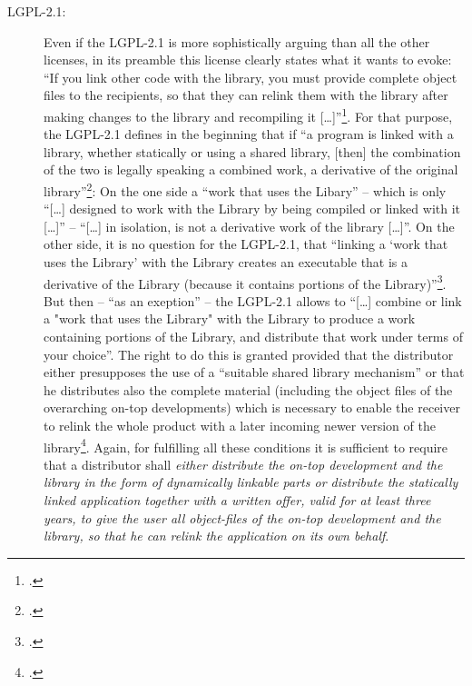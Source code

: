 \begin{description}
  \item[LGPL-2.1:] Even if the LGPL-2.1 is more sophistically arguing than all
  the other licenses, in its preamble this license clearly states what it wants
  to evoke: \enquote{If you link other code with the library, you must provide
  complete object files to the recipients, so that they can relink them with the
  library after making changes to the library and recompiling it
  [\ldots]}\footcite[cf.][\nopage wp\. preamble]{Lgpl21OsiLicense1999a}. For
  that purpose, the LGPL-2.1 defines in the beginning that if \enquote{a program
  is linked with a library, whether statically or using a shared library, [then]
  the combination of the two is legally speaking a combined work, a derivative
  of the original library}\footcite[cf.][\nopage wp.\
  preamble]{Lgpl21OsiLicense1999a}: On the one side a \enquote{work that uses
  the Libary} -- which is only \enquote{[\ldots] designed to work with the
  Library by being compiled or linked with it [\ldots]} -- \enquote{[\ldots] in
  isolation, is not a derivative work of the library [\ldots]}. On the other
  side, it is no question for the LGPL-2.1, that \enquote{linking a
  \enquote{work that uses the Library} with the Library creates an executable
  that is a derivative of the Library (because it contains portions of the
  Library)}\footcite[cf.][\nopage wp.\ §5]{Lgpl21OsiLicense1999a}. But then --
  \enquote{as an exeption} -- the LGPL-2.1 allows to \enquote{[\ldots] combine
  or link a "work that uses the Library" with the Library to produce a work
  containing portions of the Library, and distribute that work under terms of
  your choice}. The right to do this is granted provided that the distributor
  either presupposes the use of a \enquote{suitable shared library mechanism} or
  that he distributes also the complete material (including the object files of
  the overarching on-top developments) which is necessary to enable the receiver
  to relink the whole product with a later incoming newer version of the
  library\footcite[cf.][\nopage wp.\ §6, §6b adn §6c together with
  §6c]{Lgpl21OsiLicense1999a}. Again, for fulfilling all these conditions it is
  sufficient to require that a distributor shall \emph{either distribute the
  on-top development and the library in the form of dynamically linkable parts
  or distribute the statically linked application together with a written offer,
  valid for at least three years, to give the user all object-files of the
  on-top development and the library, so that he can relink the application on
  its own behalf}.

\end{description}

